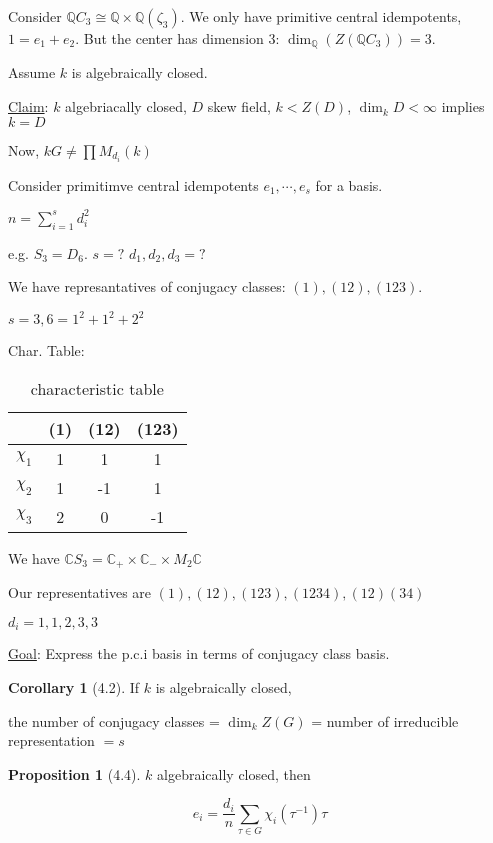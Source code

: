 \documentclass{article}
\theoremstyle{definition}
\newtheorem{proposition}[theorem]{Proposition}
\newtheorem{corollary}[theorem]{Corollary}
\begin{document}
Consider \(\mathbb{Q}C_3 \cong \mathbb{Q} \times \mathbb{Q}(\zeta_3)\). We only have primitive central idempotents, \(1 = e_1 + e_2\). But the center has dimension \(3\): \(\dim_{\mathbb{Q}}(Z(\mathbb{Q}C_3)) = 3\).

Assume \(k\) is algebraically closed.

\underline{Claim}: \(k\) algebriacally closed, \(D\) skew field, \(k < Z(D)\), \(\dim_k D < \infty\) implies \(k = D\)

Now, \(kG \neq \prod M_{d_i}(k)\) 

Consider primitimve central idempotents \(e_1, \cdots , e_s\) for a basis.

\(n = \sum_{i=1}^s d_i^2\) 

e.g. \(S_3 = D_6\). \(s=?\) \(d_1, d_2, d_3 = ?\) 

We have represantatives of conjugacy classes: \((1), (12), (123)\).

\(s=3, 6 = 1^2 + 1^2 + 2^2\) 

Char. Table:

\begin{table}[H]
    \centering
    \begin{tabular}{c|c|c|c}
        \toprule
             & (1) & (12) &  (123) \\
        \midrule
            \(\chi_1\) & 1 & 1 & 1  \\
            \(\chi_2\)  & 1 & -1 & 1  \\
            \(\chi_3\)  & 2 & 0 & -1  \\
        \bottomrule
    \end{tabular}
    \caption{characteristic table}
    \label{tab:chartable}
\end{table}

We have \(\mathbb{C} S_3 = \mathbb{C} _+ \times \mathbb{C} _- \times M_2\mathbb{C}\) 

Our representatives are \((1), (12), (123), (1234), (12)(34)\) 

\(d_i = 1, 1, 2, 3, 3\) 

\underline{Goal}: Express the p.c.i basis in terms of conjugacy class basis.

\begin{corollary}[4.2]
    If \(k\) is algebraically closed,
    
    the number of conjugacy classes = \(\dim_k Z(G)\) = number of irreducible representation \(= s\)  
\end{corollary}

\begin{proposition}
    [4.4] \(k\) algebraically closed, then

    \[
        e_i = \frac{d_i}{n} \sum_{\tau \in G} \chi_i (\tau ^{-1} ) \tau  
    \]
\end{proposition}
\end{document}
